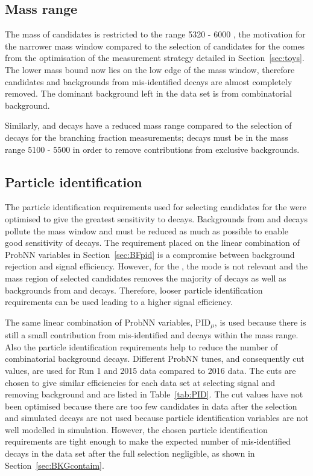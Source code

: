 \subsection{Mass range}
\label{sec:ELmass}
The mass of \bsmumu candidates is restricted to the range 5320 - 6000 \mevcc, the motivation for the narrower mass window compared to the selection of candidates for the \BFm comes from the optimisation of the measurement strategy detailed in Section~\ref{sec:toys}. The lower mass bound now lies on the low edge of the \bs mass window, therefore \bdmumu candidates and backgrounds from mis-identified decays are almost completely removed. The dominant background left in the data set is from combinatorial background. %

Similarly, \bdkpi and \bskk decays have a reduced mass range compared to the selection of \bhh decays for the branching fraction measurements; \bhh decays must be in the mass range 5100 - 5500 \mevcc in order to remove contributions from exclusive backgrounds.

\subsection{Particle identification}
\label{sec:ELpid}
The particle identification requirements used for selecting candidates for the \BFm were optimised to give the greatest sensitivity to \bdmumu decays. Backgrounds from \bhh and \lambdab decays pollute the \bd mass window and must be reduced as much as possible to enable good sensitivity of \bdmumu decays. The requirement placed on the linear combination of ProbNN variables in Section~\ref{sec:BFpid} is a compromise between background rejection and signal efficiency. However, for the \elm, the \bd mode is not relevant and the mass region of selected candidates removes the majority of \bdmumu decays as well as backgrounds from \bhh and \lambdab decays. Therefore, looser particle identification requirements can be used leading to a higher signal efficiency.%

The same linear combination of ProbNN variables, PID$_{\mu}$, is used because there is still a small contribution from mis-identified \bhh and \lambdab decays within the mass range. Also the particle identification requirements help to reduce the number of combinatorial background decays. Different ProbNN tunes, and consequently cut values, are used for Run 1 and 2015 data compared to 2016 data. The cuts are chosen to give similar efficiencies for each data set at selecting signal and removing background and are listed in Table~\ref{tab:PID}. The cut values have not been optimised because there are too few candidates in data after the selection and simulated decays are not used because particle identification variables are not well modelled in simulation. However, the chosen particle identification requirements are tight enough to make the expected number of mis-identified decays in the data set after the full selection negligible, as shown in Section~\ref{sec:BKGcontaim}. 

